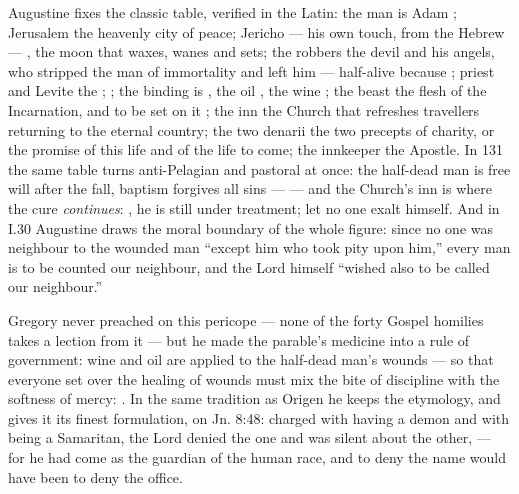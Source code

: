 \begin{witnessnote}
Augustine fixes the classic table, verified in the Latin: the man is Adam
; Jerusalem the heavenly city of peace; Jericho ---
his own touch, from the Hebrew --- , the moon that waxes, wanes and sets; the robbers the
devil and his angels, who stripped the man of immortality and left him
 --- half-alive because ; priest and Levite the
; ; the binding is
, the oil , the wine
; the beast the flesh of
the Incarnation, and to be set on it ; the inn the Church that refreshes travellers returning to the
eternal country; the two denarii the two precepts of charity, or the promise
of this life and of the life to come; the innkeeper the Apostle. In
 131 the same table turns anti-Pelagian and pastoral at once: the
half-dead man is free will after the fall, baptism forgives all sins ---
 --- and the
Church's inn is where the cure \textit{continues}: , he
is still under treatment; let no one exalt himself. And in  I.30 Augustine draws the moral boundary of the whole figure:
since no one was neighbour to the wounded man ``except him who took pity upon
him,'' every man is to be counted our neighbour, and the Lord himself
``wished also to be called our neighbour.''
\end{witnessnote}

\begin{witnessnote}
Gregory never preached on this pericope --- none of the forty Gospel homilies
takes a lection from it ---
but he made the parable's medicine into a rule of government: wine and oil are
applied to the half-dead man's wounds  --- so that everyone set over the healing of wounds must
mix the bite of discipline with the softness of mercy: . In the same tradition as Origen he keeps the
etymology, and gives it its finest formulation, on Jn. 8:48: charged with
having a demon and with being a Samaritan, the Lord denied the one and was
silent about the other,  --- for
he had come as the guardian of the human race, and to deny the name would
have been to deny the office.
\end{witnessnote}


